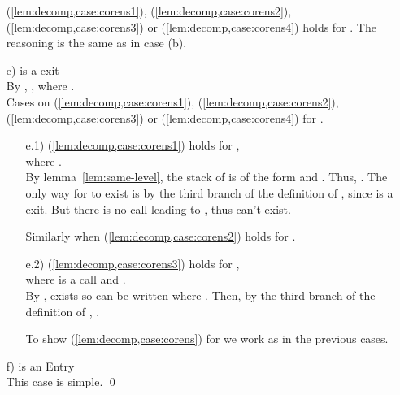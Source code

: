 \documentclass{LMCS}
\theoremstyle{definition} \newtheorem{property}[thm]{Property}
\begin{document}
\begin{enumerate}[]
  (\ref{lem:decomp,case:corens1}),
  (\ref{lem:decomp,case:corens2}),
  (\ref{lem:decomp,case:corens3})
  or (\ref{lem:decomp,case:corens4})
  holds for .
  The reasoning is the same as in case (b).
\item[e)]
   is a \daceval{} exit \\
  By \ih{},
  ,
  where . \\
  Cases on (\ref{lem:decomp,case:corens1}), (\ref{lem:decomp,case:corens2}),
  (\ref{lem:decomp,case:corens3}) or (\ref{lem:decomp,case:corens4})
  for .
  \begin{enumerate}[]
  \item[e.1)]
    (\ref{lem:decomp,case:corens1}) holds for , \ie \\
    
    where . \\
    By lemma~\ref{lem:same-level}, 
    the stack of  is of the form  and
    .
    Thus, .
    The only way for \coren{\astat} to exist is by the third branch of the
    definition of \dcoren{}, since  is a \daceval{} exit.
    But there is no call leading to \entry,
    thus \coren{\astat} can't exist.

    Similarly when (\ref{lem:decomp,case:corens2}) holds for .
  \item[e.2)]
    (\ref{lem:decomp,case:corens3}) holds for , \ie \\
     where  is a call and . \\
    By \ih{},  exists so  can be written 
     where .
    Then, by the third branch of the definition of \dcoren{}, 
    . 

    To show (\ref{lem:decomp,case:corens}) for \astat{} 
    we work as in the previous cases.
  \end{enumerate}
\item[f)]
   is an Entry \\
  This case is simple.
  \qed
\end{enumerate}
\end{document}
